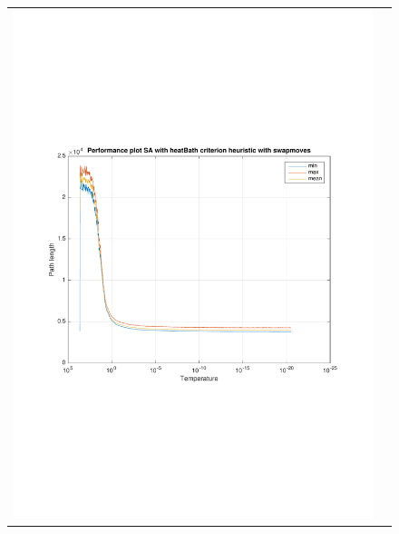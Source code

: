 \documentclass[a4paper, 11pt]{scrartcl}
\begin{document}
\begin{figure}[!ht]
  \centering
  \begin{tabular}{cc}
    \includegraphics[scale=0.4, trim={3cm 6cm 1cm 6cm}]{../figures/perfPlot_SA_heatBath_swap.pdf} & 

\end{tabular}
\end{figure}
\end{document}
